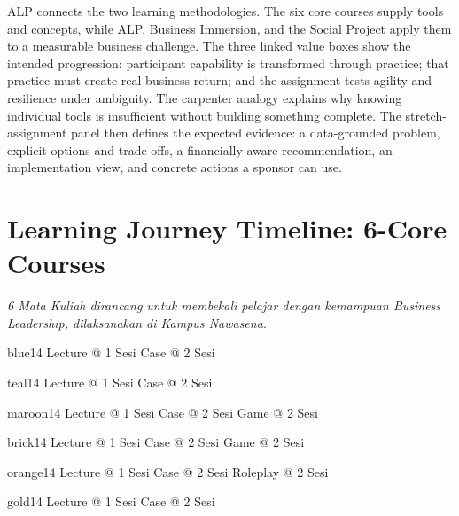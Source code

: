 \begin{visualexplanation}
ALP connects the two learning methodologies. The six core courses supply tools and concepts, while ALP, Business Immersion, and the Social Project apply them to a measurable business challenge. The three linked value boxes show the intended progression: participant capability is transformed through practice; that practice must create real business return; and the assignment tests agility and resilience under ambiguity. The carpenter analogy explains why knowing individual tools is insufficient without building something complete. The stretch-assignment panel then defines the expected evidence: a data-grounded problem, explicit options and trade-offs, a financially aware recommendation, an implementation view, and concrete actions a sponsor can use.
\end{visualexplanation}

\section{Learning Journey Timeline: 6-Core Courses}
\textit{6 Mata Kuliah dirancang untuk membekali pelajar dengan kemampuan Business Leadership, dilaksanakan di Kampus Nawasena.}
\begin{tcbraster}[raster columns=3,raster equal height=rows,raster column skip=2mm,raster row skip=2mm]
\begin{infobox}{blue}14 Lecture @ 1 Sesi Case @ 2 Sesi\end{infobox}
\begin{infobox}{teal}14 Lecture @ 1 Sesi Case @ 2 Sesi\end{infobox}
\begin{infobox}{maroon}14 Lecture @ 1 Sesi Case @ 2 Sesi Game @ 2 Sesi\end{infobox}
\begin{infobox}{brick}14 Lecture @ 1 Sesi Case @ 2 Sesi Game @ 2 Sesi\end{infobox}
\begin{infobox}{orange}14 Lecture @ 1 Sesi Case @ 2 Sesi Roleplay @ 2 Sesi\end{infobox}
\begin{infobox}{gold}14 Lecture @ 1 Sesi Case @ 2 Sesi\end{infobox}
\end{tcbraster}
